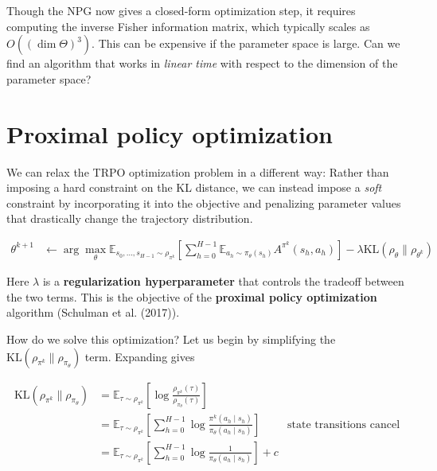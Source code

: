 \documentclass[
  letterpaper,
  DIV=11,
  numbers=noendperiod]{scrreprt}
\theoremstyle{plain}
\theoremstyle{plain}
\theoremstyle{definition}
\theoremstyle{definition}
\theoremstyle{remark}
\begin{document}
Though the NPG now gives a closed-form optimization step, it requires
computing the inverse Fisher information matrix, which typically scales
as \(O((\dim \Theta)^3)\). This can be expensive if the parameter space
is large. Can we find an algorithm that works in \emph{linear time} with
respect to the dimension of the parameter space?

\section{Proximal policy optimization}\label{sec-ppo}

We can relax the TRPO optimization problem in a different way: Rather
than imposing a hard constraint on the KL distance, we can instead
impose a \emph{soft} constraint by incorporating it into the objective
and penalizing parameter values that drastically change the trajectory
distribution.

\[
\begin{aligned}
\theta^{k+1} &\gets \arg\max_{\theta} \mathbb{E}_{s_0, \dots, s_{H-1} \sim \rho_{\pi^{k}}} \left[ \sum_{h=0}^{H-1} \mathbb{E}_{a_h\sim \pi_{\theta}(s_h)} A^{\pi^{k}}(s_h, a_h) \right] - \lambda \mathrm{KL}\left(\rho_{\theta}\parallel\rho_{\theta^k}\right)
\end{aligned}
\]

Here \(\lambda\) is a \textbf{regularization hyperparameter} that
controls the tradeoff between the two terms. This is the objective of
the \textbf{proximal policy optimization} algorithm (Schulman et al.
(2017)).

How do we solve this optimization? Let us begin by simplifying the
\(\mathrm{KL}\left(\rho_{\pi^k}\parallel\rho_{\pi_{\theta}}\right)\)
term. Expanding gives

\[
\begin{aligned}
    \mathrm{KL}\left(\rho_{\pi^k}\parallel\rho_{\pi_{\theta}}\right) & = \mathbb{E}_{\tau \sim \rho_{\pi^k}} \left[\log \frac{\rho_{\pi^k}(\tau)}{\rho_{\pi_{\theta}}(\tau)}\right]                                                       \\
                                           & = \mathbb{E}_{\tau \sim \rho_{\pi^k}} \left[ \sum_{h=0}^{H-1} \log \frac{\pi^k(a_h\mid s_h)}{\pi_{\theta}(a_h\mid s_h)}\right] & \text{state transitions cancel} \\
                                           & = \mathbb{E}_{\tau \sim \rho_{\pi^k}} \left[ \sum_{h=0}^{H-1} \log \frac{1}{\pi_{\theta}(a_h\mid s_h)}\right] + c
\end{aligned}
\]
\end{document}
